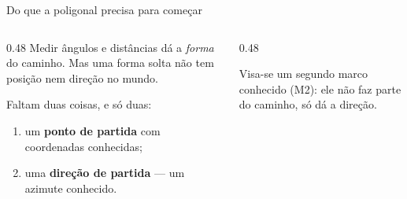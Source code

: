 \documentclass[aspectratio=169,11pt]{beamer}
\newcommand{\bnum}[1]{\textbf{\textcolor{mTeal}{#1}}}
\begin{document}
\begin{frame}{Do que a poligonal precisa para começar}
  \begin{columns}[T]
    \begin{column}{0.48\textwidth}
      Medir ângulos e distâncias dá a \emph{forma} do caminho. Mas uma forma solta não tem
      posição nem direção no mundo.
      \medskip

      Faltam duas coisas, e só duas:
      \medskip
      \begin{enumerate}
        \item um \bnum{ponto de partida} com coordenadas conhecidas;
        \item uma \bnum{direção de partida} --- um azimute conhecido.
      \end{enumerate}
    \end{column}
    \begin{column}{0.48\textwidth}
      \centering
      \smallskip

      {\scriptsize\textcolor{mStoneMid}{Visa-se um segundo marco conhecido (M2): ele não faz
      parte do caminho, só dá a direção.}}
    \end{column}
  \end{columns}
\end{frame}
\end{document}

